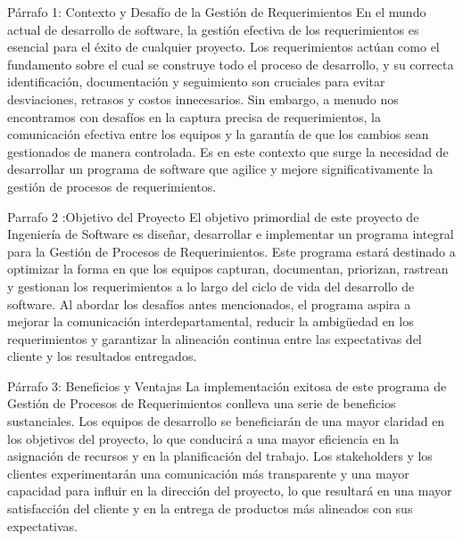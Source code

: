 Párrafo 1: Contexto y Desafío de la Gestión de Requerimientos
En el mundo actual de desarrollo de software, la gestión efectiva de los requerimientos es esencial para el éxito de cualquier proyecto. Los requerimientos actúan como el fundamento sobre el cual se construye todo el proceso de desarrollo, y su correcta identificación, documentación y seguimiento son cruciales para evitar desviaciones, retrasos y costos innecesarios. Sin embargo, a menudo nos encontramos con desafíos en la captura precisa de requerimientos, la comunicación efectiva entre los equipos y la garantía de que los cambios sean gestionados de manera controlada. Es en este contexto que surge la necesidad de desarrollar un programa de software que agilice y mejore significativamente la gestión de procesos de requerimientos.

Parrafo 2 :Objetivo del Proyecto
El objetivo primordial de este proyecto de Ingeniería de Software es diseñar, desarrollar e implementar un programa integral para la Gestión de Procesos de Requerimientos. Este programa estará destinado a optimizar la forma en que los equipos capturan, documentan, priorizan, rastrean y gestionan los requerimientos a lo largo del ciclo de vida del desarrollo de software. Al abordar los desafíos antes mencionados, el programa aspira a mejorar la comunicación interdepartamental, reducir la ambigüedad en los requerimientos y garantizar la alineación continua entre las expectativas del cliente y los resultados entregados.


Párrafo 3: Beneficios y Ventajas
La implementación exitosa de este programa de Gestión de Procesos de Requerimientos conlleva una serie de beneficios sustanciales. Los equipos de desarrollo se beneficiarán de una mayor claridad en los objetivos del proyecto, lo que conducirá a una mayor eficiencia en la asignación de recursos y en la planificación del trabajo. Los stakeholders y los clientes experimentarán una comunicación más transparente y una mayor capacidad para influir en la dirección del proyecto, lo que resultará en una mayor satisfacción del cliente y en la entrega de productos más alineados con sus expectativas.
